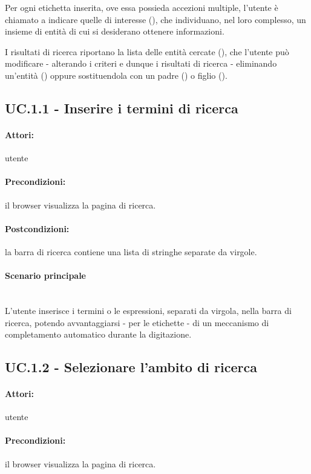\documentclass[10pt,a4paper,headinclude,footinclude,hidelinks]{scrreprt} %
\begin{document}
	Per ogni etichetta inserita, ove essa possieda accezioni multiple, l'utente è chiamato a indicare quelle di interesse (), che individuano, nel loro complesso, un insieme di entità di cui si desiderano ottenere informazioni.

	I risultati di ricerca riportano la lista delle entità cercate (), che l'utente può modificare - alterando i criteri e dunque i risultati di ricerca - eliminando un'entità () oppure sostituendola con un padre () o figlio ().

 	\subsection[UC.1.1]{UC.1.1 - Inserire i termini di ricerca}
	\label{sec:stage:ar:uc:1_1}
	\paragraph{Attori:}  utente
	\paragraph{Precondizioni:} il browser visualizza la pagina di ricerca.
	\paragraph{Postcondizioni:} la barra di ricerca contiene una lista di stringhe separate da virgole.
	\paragraph{Scenario principale} \hfill \\
	L'utente inserisce i termini o le espressioni, separati da virgola, nella barra di ricerca, potendo avvantaggiarsi - per le etichette - di un meccanismo di completamento automatico durante la digitazione.

	\subsection[UC.1.2]{UC.1.2 - Selezionare l'ambito di ricerca}
	\label{sec:stage:ar:uc:1_2}
	\paragraph{Attori:} utente
	\paragraph{Precondizioni:} il browser visualizza la pagina di ricerca.
\end{document}

